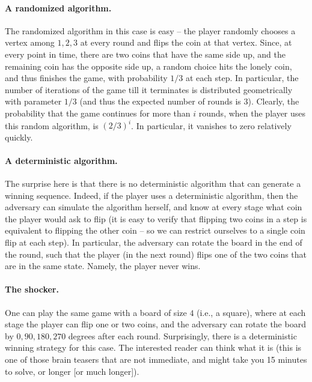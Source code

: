 \paragraph*{A randomized algorithm.}
The randomized algorithm in this case is easy -- the player randomly
chooses a vertex among $1,2,3$ at every round and flips the coin at
that vertex. Since, at every point in time, there are two coins that
have the same side up, and the remaining coin has the opposite side up,
a random choice hits the lonely coin, and thus finishes the game, with
probability $1/3$ at each step. In particular, the number of iterations
of the game till it terminates is distributed geometrically with
parameter $1/3$ (and thus the expected number of rounds is
$3$). Clearly, the probability that the game continues for more than
$i$ rounds, when the player uses this random algorithm, is
$(2/3)^i$. In particular, it vanishes to zero relatively quickly.

\paragraph*{A deterministic algorithm.}

The surprise here is that there is no deterministic algorithm that can
generate a winning sequence. Indeed, if the player uses a
deterministic algorithm, then the adversary can simulate the algorithm
herself, and know at every stage what coin the player would ask to
flip (it is easy to verify that flipping two coins in a step is
equivalent to flipping the other coin -- so we can restrict ourselves
to a single coin flip at each step). In particular, the adversary can
rotate the board in the end of the round, such that the player (in the
next round) flips one of the two coins that are in the same
state. Namely, the player never wins.

\paragraph*{The shocker.}

One can play the same game with a board of size $4$ (i.e., a square),
where at each stage the player can flip one or two coins, and the
adversary can rotate the board by $0,90,180, 270$ degrees after each
round. Surprisingly, there is a deterministic winning strategy for
this case. The interested reader can think what it is (this is one of
those brain teasers that are not immediate, and might take you 15
minutes to solve, or longer [or much longer]).

